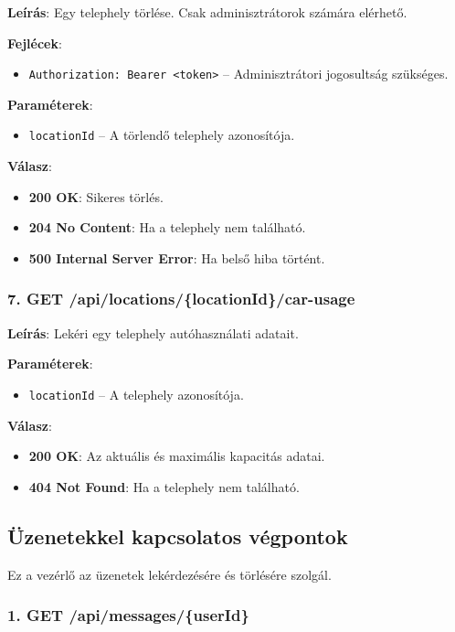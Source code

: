 \documentclass{report}[11pt]
\begin{document}
\textbf{Leírás}:  
Egy telephely törlése. Csak adminisztrátorok számára elérhető.

\textbf{Fejlécek}:  
\begin{itemize}
    \item \texttt{Authorization: Bearer <token>} – Adminisztrátori jogosultság szükséges.
\end{itemize}

\textbf{Paraméterek}:  
\begin{itemize}
    \item \texttt{locationId} – A törlendő telephely azonosítója.
\end{itemize}

\textbf{Válasz}:  
\begin{itemize}
    \item \textbf{200 OK}: Sikeres törlés.
    \item \textbf{204 No Content}: Ha a telephely nem található.
    \item \textbf{500 Internal Server Error}: Ha belső hiba történt.
\end{itemize}

\subsubsection{7. GET /api/locations/\{locationId\}/car-usage}

\textbf{Leírás}:  
Lekéri egy telephely autóhasználati adatait.

\textbf{Paraméterek}:  
\begin{itemize}
    \item \texttt{locationId} – A telephely azonosítója.
\end{itemize}

\textbf{Válasz}:  
\begin{itemize}
    \item \textbf{200 OK}: Az aktuális és maximális kapacitás adatai.
    \item \textbf{404 Not Found}: Ha a telephely nem található.
\end{itemize}

\subsection{Üzenetekkel kapcsolatos végpontok}

Ez a vezérlő az üzenetek lekérdezésére és törlésére szolgál.

\subsubsection{1. GET /api/messages/\{userId\}}
\end{document}
